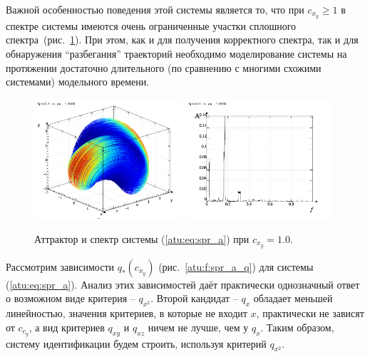 Важной особенностью поведения этой системы является то, что при $ c_{x_y} \ge 1 $
в спектре системы имеются очень ограниченные участки сплошного спектра~(рис.~\ref{atu:f:spr_a_p_1000}).
При этом, как и для получения корректного спектра, так и для обнаружения ``разбегания'' траекторий
необходимо моделирование системы на протяжении достаточно длительного
(по сравнению с многими схожими системами) модельного времени.

\begin{figure}[htb!]
\centerline{
  \includegraphics[width=0.49\textwidth]{p/cha/spr_a/sprott_a-p_xyz_cx_y=1x000.png}
  \includegraphics[width=0.49\textwidth]{p/cha/spr_a/sprott_a_f-p_f_cx_y=1x000.png}
}
\caption{Аттрактор и спектр системы (\ref{atu:eq:spr_a}) при $ c_{x_y} =1.0 $.
}
\label{atu:f:spr_a_p_1000}
\end{figure}


Рассмотрим зависимости $q_{*}(c_{x_y}) $ (рис.~\ref{atu:f:spr_a_q})
для системы (\ref{atu:eq:spr_a}). Анализ этих зависимостей
даёт практически однозначный ответ о возможном виде критерия -- $q_{x^2}$.
Второй кандидат -- $q_{x}$ обладает меньшей линейностью,
значения критериев, в которые не входит $x$, практически не зависят от $c_{c_y}$,
а вид критериев $q_{xy}$ и $q_{xz}$ ничем не лучше, чем у $q_{x}$.
Таким образом, систему идентификации будем строить, используя критерий  $q_{x^2}$.

